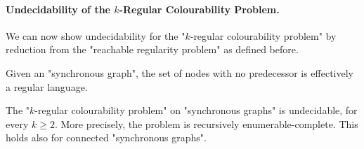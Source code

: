 \paragraph*{Undecidability of the $k$-Regular Colourability Problem.}
We can now show undecidability for the "$k$-regular colourability problem" by reduction from the "reachable regularity problem" as defined before.

\begin{fact}
    \AP\label{fact:initial-nodes-are-regular}
    Given an "synchronous graph", the set of nodes with no predecessor is effectively a regular language. 
\end{fact}

\begin{theorem}
    \AP\label{thm:k-reg-col-undec}
    The "$k$-regular colourability problem" on "synchronous graphs" is undecidable, for every $k\geq 2$. More precisely, the problem is recursively enumerable-complete. This holds also for connected "synchronous graphs".
\end{theorem}

